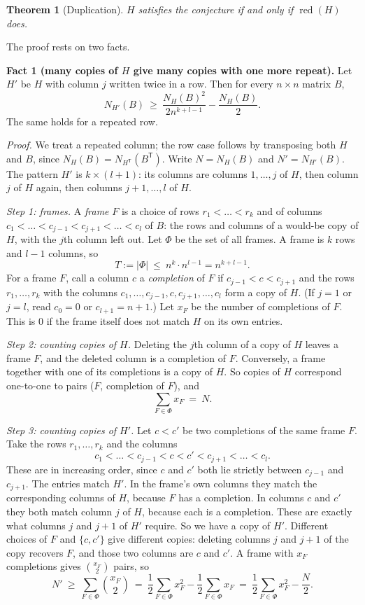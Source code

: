 \documentclass{article}
\theoremstyle{plain}
\newtheorem{theorem}{Theorem}
\theoremstyle{definition}
\begin{document}
\begin{theorem}[Duplication]\label{thm:dup}
$H$ satisfies the conjecture if and only if $\operatorname{red}(H)$ does.
\end{theorem}

\medskip
The proof rests on two facts.

\textbf{Fact 1 (many copies of $H$ give many copies with one more repeat).}
Let $H'$ be $H$ with column $j$ written twice in a row. Then for every $n\times n$ matrix $B$,
\[
 N_{H'}(B)\ \ge\ \frac{N_H(B)^2}{2n^{k+l-1}}-\frac{N_H(B)}{2}.
\]
The same holds for a repeated row.

\emph{Proof.} We treat a repeated column; the row case follows by transposing
both $H$ and $B$, since $N_H(B)=N_{H^{\mathsf T}}(B^{\mathsf T})$. Write
$N=N_H(B)$ and $N'=N_{H'}(B)$. The pattern $H'$ is $k\times(l+1)$: its columns
are columns $1,\dots,j$ of $H$, then column $j$ of $H$ again, then columns
$j+1,\dots,l$ of $H$.

\emph{Step 1: frames.} A \emph{frame} $F$ is a choice of rows
$r_1<\dots<r_k$ and of columns $c_1<\dots<c_{j-1}<c_{j+1}<\dots<c_l$ of $B$:
the rows and columns of a would-be copy of $H$, with the $j$th column left out.
Let $\Phi$ be the set of all frames. A frame is $k$ rows and $l-1$ columns, so
\[
 T:=|\Phi|\ \le\ n^k\cdot n^{l-1}=n^{k+l-1}.
\]
For a frame $F$, call a column $c$ a \emph{completion} of $F$ if
$c_{j-1}<c<c_{j+1}$ and the rows $r_1,\dots,r_k$ with the columns
$c_1,\dots,c_{j-1},c,c_{j+1},\dots,c_l$ form a copy of $H$. (If $j=1$ or
$j=l$, read $c_0=0$ or $c_{l+1}=n+1$.) Let $x_F$ be the number of completions
of $F$. This is $0$ if the frame itself does not match $H$ on its own entries.

\emph{Step 2: counting copies of $H$.} Deleting the $j$th column of a copy of
$H$ leaves a frame $F$, and the deleted column is a completion of $F$.
Conversely, a frame together with one of its completions is a copy of $H$. So
copies of $H$ correspond one-to-one to pairs ($F$, completion of $F$), and
\[
 \sum_{F\in\Phi}x_F\ =\ N.
\]

\emph{Step 3: counting copies of $H'$.} Let $c<c'$ be two completions of the
same frame $F$. Take the rows $r_1,\dots,r_k$ and the columns
\[
 c_1<\dots<c_{j-1}<c<c'<c_{j+1}<\dots<c_l .
\]
These are in increasing order, since $c$ and $c'$ both lie strictly between
$c_{j-1}$ and $c_{j+1}$. The entries match $H'$. In the frame's own columns they
match the corresponding columns of $H$, because $F$ has a completion. In
columns $c$ and $c'$ they both match column $j$ of $H$, because each is a
completion. These are exactly what columns $j$ and $j+1$ of $H'$ require. So we
have a copy of $H'$. Different choices of $F$ and $\{c,c'\}$ give different
copies: deleting columns $j$ and $j+1$ of the copy recovers $F$, and those two
columns are $c$ and $c'$. A frame with $x_F$ completions gives
$\binom{x_F}{2}$ pairs, so
\[
 N'\ \ge\ \sum_{F\in\Phi}\binom{x_F}{2}
 \ =\ \frac12\sum_{F\in\Phi}x_F^2-\frac12\sum_{F\in\Phi}x_F
 \ =\ \frac12\sum_{F\in\Phi}x_F^2-\frac N2 .
\]
\end{document}

